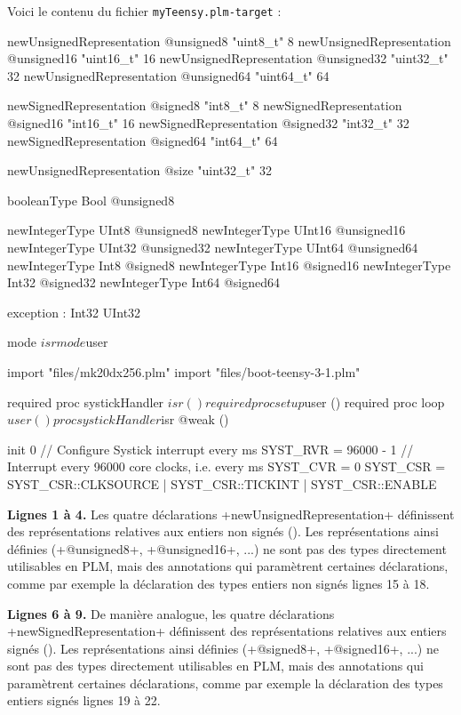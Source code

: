 Voici le contenu du fichier \texttt{myTeensy.plm-target} :
\begin{PLM}[1]
newUnsignedRepresentation @unsigned8  "uint8_t"   8
newUnsignedRepresentation @unsigned16 "uint16_t" 16
newUnsignedRepresentation @unsigned32 "uint32_t" 32
newUnsignedRepresentation @unsigned64 "uint64_t" 64

newSignedRepresentation @signed8  "int8_t"   8
newSignedRepresentation @signed16 "int16_t" 16
newSignedRepresentation @signed32 "int32_t" 32
newSignedRepresentation @signed64 "int64_t" 64

newUnsignedRepresentation @size "uint32_t" 32

booleanType Bool @unsigned8

newIntegerType UInt8  @unsigned8
newIntegerType UInt16 @unsigned16
newIntegerType UInt32 @unsigned32
newIntegerType UInt64 @unsigned64
newIntegerType Int8  @signed8
newIntegerType Int16 @signed16
newIntegerType Int32 @signed32
newIntegerType Int64 @signed64

exception : Int32 UInt32

mode $isr
mode $user

import "files/mk20dx256.plm"
import "files/boot-teensy-3-1.plm"

required proc systickHandler $isr ()
required proc setup $user ()
required proc loop $user ()

proc systickHandler $isr @weak () {
}

init 0 { // Configure Systick interrupt every ms
  SYST_RVR = 96000 - 1 // Interrupt every 96000 core clocks, i.e. every ms
  SYST_CVR = 0
  SYST_CSR = SYST_CSR::CLKSOURCE | SYST_CSR::TICKINT | SYST_CSR::ENABLE
}
\end{PLM}

{\bf Lignes 1 à 4.} Les quatre déclarations \plm+newUnsignedRepresentation+ définissent des représentations relatives aux entiers non signés (). Les représentations ainsi définies (\plm+@unsigned8+, \plm+@unsigned16+, ...) ne sont pas des types directement utilisables en PLM, mais des annotations qui paramètrent certaines déclarations, comme par exemple la déclaration des types entiers non signés lignes 15 à 18.

{\bf Lignes 6 à 9.} De manière analogue, les quatre déclarations \plm+newSignedRepresentation+ définissent des représentations relatives aux entiers signés (). Les représentations ainsi définies (\plm+@signed8+, \plm+@signed16+, ...) ne sont pas des types directement utilisables en PLM, mais des annotations qui paramètrent certaines déclarations, comme par exemple la déclaration des types entiers signés lignes 19 à 22.

